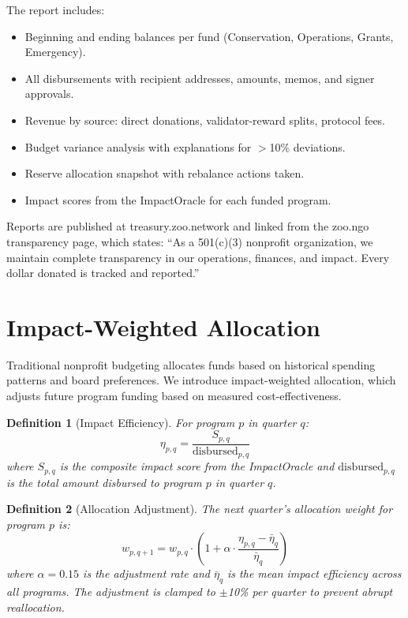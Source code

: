 \documentclass[11pt,letterpaper]{article}
\newtheorem{definition}{Definition}[section]
\begin{document}
The report includes:
\begin{itemize}
    \item Beginning and ending balances per fund (Conservation, Operations, Grants, Emergency).
    \item All disbursements with recipient addresses, amounts, memos, and signer approvals.
    \item Revenue by source: direct donations, validator-reward splits, protocol fees.
    \item Budget variance analysis with explanations for $>$10\% deviations.
    \item Reserve allocation snapshot with rebalance actions taken.
    \item Impact scores from the ImpactOracle for each funded program.
\end{itemize}

Reports are published at treasury.zoo.network and linked from the zoo.ngo transparency page, which states: ``As a 501(c)(3) nonprofit organization, we maintain complete transparency in our operations, finances, and impact. Every dollar donated is tracked and reported.''

\section{Impact-Weighted Allocation}
\label{sec:impact}

Traditional nonprofit budgeting allocates funds based on historical spending patterns and board preferences. We introduce impact-weighted allocation, which adjusts future program funding based on measured cost-effectiveness.

\begin{definition}[Impact Efficiency]
For program $p$ in quarter $q$:
\begin{equation}
    \eta_{p,q} = \frac{S_{p,q}}{\text{disbursed}_{p,q}}
\end{equation}
where $S_{p,q}$ is the composite impact score from the ImpactOracle and $\text{disbursed}_{p,q}$ is the total amount disbursed to program $p$ in quarter $q$.
\end{definition}

\begin{definition}[Allocation Adjustment]
The next quarter's allocation weight for program $p$ is:
\begin{equation}
    w_{p,q+1} = w_{p,q} \cdot \left(1 + \alpha \cdot \frac{\eta_{p,q} - \bar{\eta}_q}{\bar{\eta}_q}\right)
\end{equation}
where $\alpha = 0.15$ is the adjustment rate and $\bar{\eta}_q$ is the mean impact efficiency across all programs. The adjustment is clamped to $\pm$10\% per quarter to prevent abrupt reallocation.
\end{definition}
\end{document}
